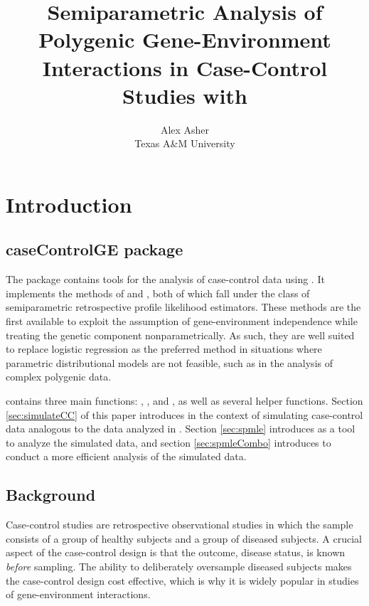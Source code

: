 \documentclass[nojss]{jss}
\author{
Alex Asher\\Texas A\&M University
}
\title{Semiparametric Analysis of Polygenic Gene-Environment Interactions in
Case-Control Studies with \pkg{caseControlGE}}
\begin{document}
\begin{titlepage}
\end{titlepage}

\def\bbeta{\mbox{\boldmath $\beta$}} \def\pr{\hbox{pr}}

\section{Introduction}

\subsection{caseControlGE package}

The  package \citep{Asher2018R} contains tools for
the analysis of case-control data using  \citep{R2018}. It
implements the methods of \citet{Stalder2017} and
\citet{Wang2018unpublished}, both of which fall under the class of
semiparametric retrospective profile likelihood estimators. These
methods are the first available to exploit the assumption of
gene-environment independence while treating the genetic component
nonparametrically. As such, they are well suited to replace logistic
regression as the preferred method in situations where parametric
distributional models are not feasible, such as in the analysis of
complex polygenic data.

 contains three main functions: ,
, and , as well as several helper
functions. Section \ref{sec:simulateCC} of this paper introduces
 in the context of simulating case-control data
analogous to the data analyzed in \cite{Wang2018unpublished}. Section
\ref{sec:spmle} introduces  as a tool to analyze the
simulated data, and section \ref{sec:spmleCombo} introduces
 to conduct a more efficient analysis of the simulated
data.

\subsection{Background}

Case-control studies are retrospective observational studies in which
the sample consists of a group of healthy subjects and a group of
diseased subjects. A crucial aspect of the case-control design is that
the outcome, disease status, is known \emph{before} sampling. The
ability to deliberately oversample diseased subjects makes the
case-control design cost effective, which is why it is widely popular in
studies of gene-environment interactions.
\end{document}

